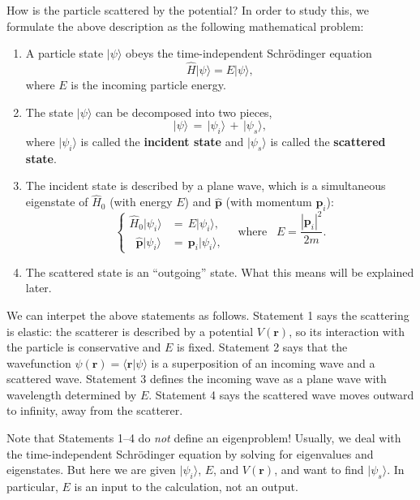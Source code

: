 \documentclass[pra,12pt]{revtex4-2}
\begin{document}
How is the particle scattered by the potential?  In order to study
this, we formulate the above description as the following mathematical
problem:
\begin{enumerate}
\item 
A particle state $|\psi\rangle$ obeys the time-independent
Schr\"odinger equation
\begin{equation}
  \hat{H} |\psi\rangle = E |\psi\rangle,
\end{equation}
where $E$ is the incoming particle energy.

\item
The state $|\psi\rangle$ can be decomposed into two pieces,
\begin{equation}
  |\psi\rangle \,=\, |\psi_i\rangle \,+\, |\psi_s\rangle,
\end{equation}
where $|\psi_i\rangle$ is called the \textbf{incident state} and
$|\psi_s\rangle$ is called the \textbf{scattered state}.

\item
The incident state is described by a plane wave, which is a
simultaneous eigenstate of $\hat{H}_0$ (with energy $E$) and
$\hat{\mathbf{p}}$ (with momentum $\mathbf{p}_i$):
\begin{equation}
  \begin{cases}
  \hat{H}_0 |\psi_i\rangle &= \, E |\psi_i\rangle, \\
  \;\;\hat{\mathbf{p}} |\psi_i\rangle &= \, \mathbf{p}_i |\psi_i\rangle,
  \end{cases}
  \quad \mathrm{where} \;\;\; E = \frac{|\mathbf{p}_i|^2}{2m}.
\end{equation}

\item
The scattered state is an ``outgoing'' state.  What this means will be
explained later.
\end{enumerate}
We can interpet the above statements as follows.  Statement 1 says the
scattering is elastic: the scatterer is described by a potential
$V(\mathbf{r})$, so its interaction with the particle is conservative
and $E$ is fixed.  Statement 2 says that the wavefunction
$\psi(\mathbf{r}) = \langle \mathbf{r} |\psi\rangle$ is a
superposition of an incoming wave and a scattered wave.  Statement 3
defines the incoming wave as a plane wave with wavelength determined
by $E$.  Statement 4 says the scattered wave moves outward to
infinity, away from the scatterer.

Note that Statements 1--4 do \textit{not} define an eigenproblem!
Usually, we deal with the time-independent Schr\"odinger equation by
solving for eigenvalues and eigenstates.  But here we are given
$|\psi_i\rangle$, $E$, and $V(\mathbf{r})$, and want to find
$|\psi_s\rangle$.  In particular, $E$ is an input to the calculation,
not an output.
\end{document}
